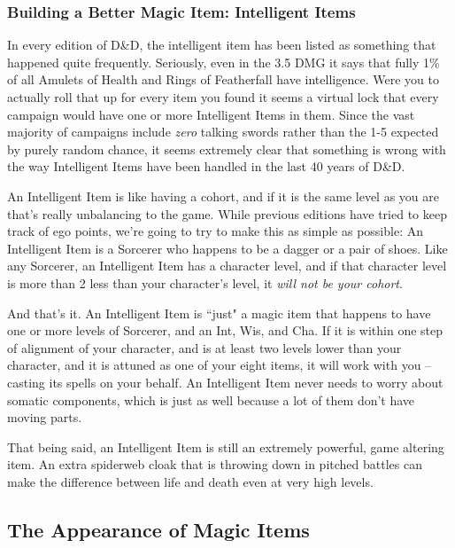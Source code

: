 \subsubsection{Building a Better Magic Item: Intelligent Items}
\vspace*{-8pt}

In every edition of D\&D, the intelligent item has been listed as something that happened quite frequently. Seriously, even in the 3.5 DMG it says that fully 1\% of all Amulets of Health and Rings of Featherfall have intelligence. Were you to actually roll that up for every item you found it seems a virtual lock that every campaign would have one or more Intelligent Items in them. Since the vast majority of campaigns include \textit{zero} talking swords rather than the 1-5 expected by purely random chance, it seems extremely clear that something is wrong with the way Intelligent Items have been handled in the last 40 years of D\&D.

An Intelligent Item is like having a cohort, and if it is the same level as you are that's really unbalancing to the game. While previous editions have tried to keep track of ego points, we're going to try to make this as simple as possible: An Intelligent Item is a Sorcerer who happens to be a dagger or a pair of shoes. Like any Sorcerer, an Intelligent Item has a character level, and if that character level is more than 2 less than your character's level, it \textit{will not be your cohort}.

And that's it. An Intelligent Item is ``just" a magic item that happens to have one or more levels of Sorcerer, and an Int, Wis, and Cha. If it is within one step of alignment of your character, and is at least two levels lower than your character, and it is attuned as one of your eight items, it will work with you -- casting its spells on your behalf. An Intelligent Item never needs to worry about somatic components, which is just as well because a lot of them don't have moving parts.

That being said, an Intelligent Item is still an extremely powerful, game altering item. An extra spiderweb cloak that is throwing down  in pitched battles can make the difference between life and death even at very high levels.

\subsection{The Appearance of Magic Items}
\vspace*{-8pt}

